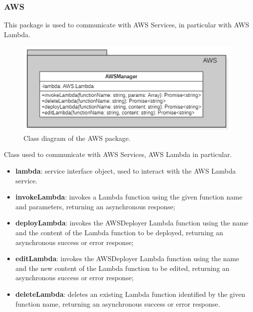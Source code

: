 	\subsubsection{AWS}
	This package is used to communicate with AWS Services, in particular with AWS Lambda. 
	\begin{figure} [h!]
		\centering
		\includegraphics[width=0.8\linewidth]{diagrammi/etherless-server/AWS}
		\caption{Class diagram of the AWS package.}
	\end{figure}
	Class used to communicate with AWS Services, AWS Lambda in particular. 
	\begin{itemize}
		\item \textbf{lambda}: service interface object, used to interact with the AWS Lambda service.
	\end{itemize}
	\begin{itemize}
		\item \textbf{invokeLambda}: invokes a Lambda function using the given function name and parameters, returning an asynchronous response;
		\item \textbf{deployLambda}: invokes the AWSDeployer Lambda function using the name and the content of the Lambda function to be deployed, returning an asynchronous success or error response;
		\item \textbf{editLambda}: invokes the AWSDeployer Lambda function using the name and the new content of the Lambda function to be edited, returning an asynchronous success or error response;
		\item \textbf{deleteLambda}: deletes an existing Lambda function identified by the given function name, returning an asynchronous success or error response.
	\end{itemize}
